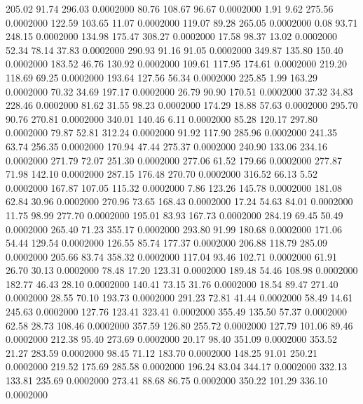  205.02   91.74  296.03   0.0002000
  80.76  108.67   96.67   0.0002000
   1.91    9.62  275.56   0.0002000
 122.59  103.65   11.07   0.0002000
 119.07   89.28  265.05   0.0002000
   0.08   93.71  248.15   0.0002000
 134.98  175.47  308.27   0.0002000
  17.58   98.37   13.02   0.0002000
  52.34   78.14   37.83   0.0002000
 290.93   91.16   91.05   0.0002000
 349.87  135.80  150.40   0.0002000
 183.52   46.76  130.92   0.0002000
 109.61  117.95  174.61   0.0002000
 219.20  118.69   69.25   0.0002000
 193.64  127.56   56.34   0.0002000
 225.85    1.99  163.29   0.0002000
  70.32   34.69  197.17   0.0002000
  26.79   90.90  170.51   0.0002000
  37.32   34.83  228.46   0.0002000
  81.62   31.55   98.23   0.0002000
 174.29   18.88   57.63   0.0002000
 295.70   90.76  270.81   0.0002000
 340.01  140.46    6.11   0.0002000
  85.28  120.17  297.80   0.0002000
  79.87   52.81  312.24   0.0002000
  91.92  117.90  285.96   0.0002000
 241.35   63.74  256.35   0.0002000
 170.94   47.44  275.37   0.0002000
 240.90  133.06  234.16   0.0002000
 271.79   72.07  251.30   0.0002000
 277.06   61.52  179.66   0.0002000
 277.87   71.98  142.10   0.0002000
 287.15  176.48  270.70   0.0002000
 316.52   66.13    5.52   0.0002000
 167.87  107.05  115.32   0.0002000
   7.86  123.26  145.78   0.0002000
 181.08   62.84   30.96   0.0002000
 270.96   73.65  168.43   0.0002000
  17.24   54.63   84.01   0.0002000
  11.75   98.99  277.70   0.0002000
 195.01   83.93  167.73   0.0002000
 284.19   69.45   50.49   0.0002000
 265.40   71.23  355.17   0.0002000
 293.80   91.99  180.68   0.0002000
 171.06   54.44  129.54   0.0002000
 126.55   85.74  177.37   0.0002000
 206.88  118.79  285.09   0.0002000
 205.66   83.74  358.32   0.0002000
 117.04   93.46  102.71   0.0002000
  61.91   26.70   30.13   0.0002000
  78.48   17.20  123.31   0.0002000
 189.48   54.46  108.98   0.0002000
 182.77   46.43   28.10   0.0002000
 140.41   73.15   31.76   0.0002000
  18.54   89.47  271.40   0.0002000
  28.55   70.10  193.73   0.0002000
 291.23   72.81   41.44   0.0002000
  58.49   14.61  245.63   0.0002000
 127.76  123.41  323.41   0.0002000
 355.49  135.50   57.37   0.0002000
  62.58   28.73  108.46   0.0002000
 357.59  126.80  255.72   0.0002000
 127.79  101.06   89.46   0.0002000
 212.38   95.40  273.69   0.0002000
  20.17   98.40  351.09   0.0002000
 353.52   21.27  283.59   0.0002000
  98.45   71.12  183.70   0.0002000
 148.25   91.01  250.21   0.0002000
 219.52  175.69  285.58   0.0002000
 196.24   83.04  344.17   0.0002000
 332.13  133.81  235.69   0.0002000
 273.41   88.68   86.75   0.0002000
 350.22  101.29  336.10   0.0002000
